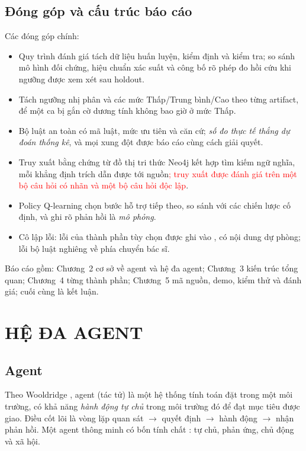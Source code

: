 \documentclass[12pt,a4paper]{report}
\newcommand{\code}[1]{{\small\path{#1}}}
\newcommand{\capnhat}[1]{\textcolor{red}{#1}}
\begin{document}
\section{Đóng góp và cấu trúc báo cáo}
Các đóng góp chính:
\begin{itemize}[nosep]
\item Quy trình đánh giá tách dữ liệu huấn luyện, kiểm định và kiểm tra; so sánh mô hình đối chứng, hiệu chuẩn xác suất và công bố rõ phép đo hồi cứu khi ngưỡng được xem xét sau holdout.
\item Tách ngưỡng nhị phân và các mức Thấp/Trung bình/Cao theo từng artifact, để một ca bị gắn cờ dương tính không bao giờ ở mức Thấp.
\item Bộ luật an toàn có mã luật, mức ưu tiên và căn cứ; \emph{số đo thực tế thắng dự đoán thống kê}, và mọi xung đột được báo cáo cùng cách giải quyết.
\item Truy xuất bằng chứng từ đồ thị tri thức Neo4j kết hợp tìm kiếm ngữ nghĩa, mỗi khẳng định trích dẫn được tới nguồn\capnhat{; truy xuất được đánh giá trên một bộ câu hỏi có nhãn và một bộ câu hỏi độc lập}.
\item Policy Q-learning chọn bước hỗ trợ tiếp theo, so sánh với các chiến lược cố định, và ghi rõ phản hồi là \emph{mô phỏng}.
\item Cô lập lỗi: lỗi của thành phần tùy chọn được ghi vào \code{degraded}, có nội dung dự phòng; lỗi bộ luật nghiêng về phía chuyển bác sĩ.
\end{itemize}
Báo cáo gồm: Chương~2 cơ sở về agent và hệ đa agent; Chương~3 kiến trúc tổng quan; Chương~4 từng thành phần; Chương~5 mã nguồn, demo, kiểm thử và đánh giá; cuối cùng là kết luận.

\chapter{HỆ ĐA AGENT}

\section{Agent}
Theo Wooldridge \cite{wooldridge2009}, agent (tác tử) là một hệ thống tính toán đặt trong một môi trường, có khả năng \emph{hành động tự chủ} trong môi trường đó để đạt mục tiêu được giao. Điều cốt lõi là vòng lặp quan sát $\rightarrow$ quyết định $\rightarrow$ hành động $\rightarrow$ nhận phản hồi. Một agent thông minh có bốn tính chất \cite{jennings1998}: tự chủ, phản ứng, chủ động và xã hội.
\end{document}
